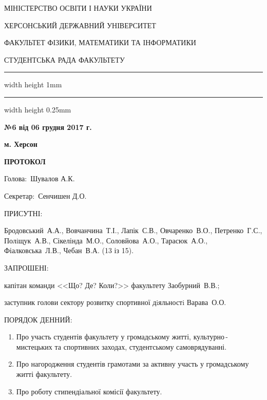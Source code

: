 \documentclass[
	a4paper,
	12pt,
	oneside,
	draft
]{extreport}
\newcommand{\heading}{\begin{center}
\parindent=0cm\parskip=-0.1cm\bfseries\footnotesize
\par МІНІСТЕРСТВО ОСВІТИ І НАУКИ УКРАЇНИ
\par ХЕРСОНСЬКИЙ ДЕРЖАВНИЙ УНІВЕРСИТЕТ
\par ФАКУЛЬТЕТ ФІЗИКИ, МАТЕМАТИКИ ТА ІНФОРМАТИКИ
\parskip=-0.2cm\par\large СТУДЕНТСЬКА РАДА ФАКУЛЬТЕТУ
\par\hrule width \hsize height 1mm \kern 0.25mm \hrule width \hsize height 0.25mm
\end{center}}
\newcommand{\Requisites}[4]{\par\noindent
\begin{minipage}[t]{80mm}
	\begin{minipage}[t]{\textwidth}
		{\par\noindent\textbf{№#1 від #2}}
	\end{minipage}
	\par	
	\begin{minipage}[t]{\textwidth}
		{\par\noindent #3}	
	\end{minipage}
\end{minipage}
\hfill
\begin{minipage}[t]{60mm}
	\par\noindent #4
\end{minipage}
}
\newcommand{\Attendees}[1]{{\par\noindent ПРИСУТНІ: \par #1}}
\newcommand{\Invented}[1]{{\par\noindent ЗАПРОШЕНІ: \par #1}}
\newcommand{\topic}[1]{\item #1}
\newenvironment{protocolAgenda}
	{\bigskip\par\noindent ПОРЯДОК ДЕННИЙ:
		\begin{enumerate}[topsep=0pt,itemsep=-1ex,partopsep=1ex,parsep=1ex]}
	{\end{enumerate}}
\begin{document}
\pagestyle{empty}
\heading
\Requisites
{6}
{06 грудня 2017 г.}
{}{\hfill\bfseries  м. Херсон}

\begin{center}\textbf{ПРОТОКОЛ}\end{center}

\par\noindent Голова:~Шувалов А.К.
\par\noindent Секретар:~Сенчишен Д.О.

\Attendees{
Бродовський~А.А.,
Вовчанчина~Т.І.,
Лапік~С.В.,
Овчаренко~В.О.,
Петренко~Г.С.,
Полiщук~А.В.,
Сікелінда~М.О.,
Соловйова~А.О.,
Тарасюк~А.О.,
Фіалковська~Л.В.,
Чебан~В.А.
(13 із 15).}

\Invented{
капітан команди <<Що? Де? Коли?>> факультету Заобурний~В.В.;

заступник голови сектору розвитку спортивної дiяльностi Варава~О.О.}

\begin{protocolAgenda}
\topic{Про участь студентів факультету у громадському житті, культурно\,-\,мистецьких та спортивних заходах, студентському самоврядуванні.}
\topic{Про нагородження студентів грамотами за активну участь у громадському житті факультету.}
\topic{Про роботу стипендіальної комісії факультету.}
\end{protocolAgenda}
\end{document}
